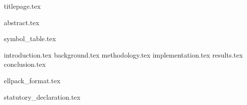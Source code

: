 \documentclass[11pt,fleqn,twoside,ngerman]{article}
\begin{document}
  {titlepage.tex}

  \setcounter{page}{0}

  \cleardoublepage
  {abstract.tex}

  \tableofcontents

  \listoffigures

  {symbol_table.tex}

  \cleardoublepage
  {introduction.tex}
  {background.tex}
  {methodology.tex}
  {implementation.tex}
  {results.tex}
  {conclusion.tex}

  \nocite{*}
  
  

  \cleardoublepage
  \appendix
  {ellpack_format.tex}

  \cleardoublepage
  {statutory_declaration.tex}
\end{document}
